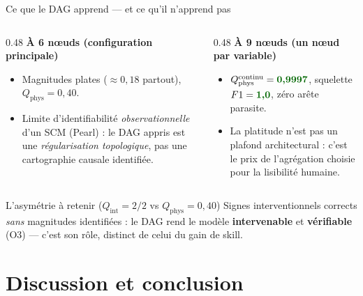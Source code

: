 \documentclass[aspectratio=169,10pt]{beamer}
\newcommand{\tgood}[1]{\textcolor{green!40!black}{\textbf{#1}}}
\newcommand{\tbad}[1]{\textcolor{uriaccent}{#1}}
\begin{document}
\begin{frame}{Ce que le DAG apprend --- et ce qu'il n'apprend pas}
  \begin{columns}[T]
    \begin{column}{0.48\textwidth}
      \textbf{À 6 n\oe{}uds (configuration principale)}
      \small
      \begin{itemize}
        \item Magnitudes \tbad{plates} ($\approx 0{,}18$ partout), $Q_{\mathrm{phys}} = 0{,}40$.
        \item Limite d'identifiabilité \emph{observationnelle} d'un SCM (Pearl) :
              le DAG appris est une \emph{régularisation topologique}, pas une
              cartographie causale identifiée.
      \end{itemize}
    \end{column}
    \begin{column}{0.48\textwidth}
      \textbf{À 9 n\oe{}uds (un n\oe{}ud par variable)}
      \small
      \begin{itemize}
        \item $Q_{\mathrm{phys}}^{\mathrm{continu}} = \tgood{0{,}9997}$,
              squelette $F1 = \tgood{1{,}0}$, zéro arête parasite.
        \item La platitude n'est \alert{pas un plafond architectural} : c'est le prix
              de l'agrégation choisie pour la lisibilité humaine.
      \end{itemize}
    \end{column}
  \end{columns}
  \vspace{0.25cm}
  \begin{block}{L'asymétrie à retenir ($Q_{\mathrm{int}} = 2/2$ vs $Q_{\mathrm{phys}} = 0{,}40$)}
    \small Signes interventionnels corrects \emph{sans} magnitudes identifiées :
    le DAG rend le modèle \textbf{intervenable} et \textbf{vérifiable} (O3) ---
    c'est son rôle, distinct de celui du gain de skill.
  \end{block}
\end{frame}

\section{Discussion et conclusion}
\end{document}
